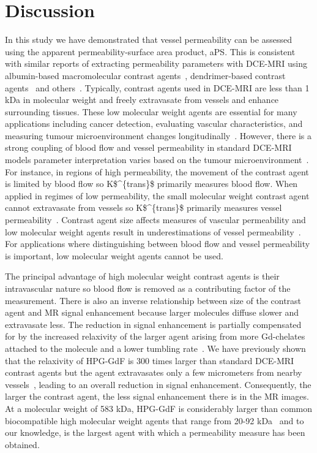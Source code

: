 \section{Discussion}

In this study we have demonstrated that vessel permeability can be assessed using the apparent permeability-surface area product, \acs{aPS}.
This is consistent with similar reports of extracting permeability parameters with \acs{DCE-MRI} using albumin-based macromolecular contrast agents~\cite{DaldrupLink:2004gy,Turetschek:2001wu}, dendrimer-based contrast agents~\cite{deLussanet:2005cb} and others~\cite{Turetschek:2004bw}.
Typically, contrast agents used in \acs{DCE-MRI} are less than 1 kDa in molecular weight and freely extravasate from vessels and enhance surrounding tissues.
These low molecular weight agents are essential for many applications including cancer detection,  evaluating vascular characteristics, and measuring tumour microenvironment changes longitudinally~\cite{Padhani:2002cj}.
However, there is a strong coupling of blood flow and vessel permeability in standard \acs{DCE-MRI} models parameter interpretation varies based on the tumour microenvironment~\cite{Gerstner:2008ba}.
For instance, in regions of high permeability, the movement of the contrast agent is limited by blood flow so \acs{K$^{trans}$} primarily measures blood flow.
When applied in regimes of low permeability, the small molecular weight contrast agent cannot extravasate from vessels so \acs{K$^{trans}$} primarily measures vessel permeability~\cite{Tofts:1999we}.
Contrast agent size affects measures of vascular permeability and low molecular weight agents result in underestimations of vessel permeability~\cite{deLussanet:2005cb}.
For applications where distinguishing between blood flow and vessel permeability is important, low molecular weight agents cannot be used.

The principal advantage of high molecular weight contrast agents is their intravascular nature so blood flow is removed as a contributing factor of the measurement.
There is also an inverse relationship between size of the contrast agent and MR signal enhancement because larger molecules diffuse slower and extravasate less.
The reduction in signal enhancement is partially compensated for by the increased relaxivity of the larger agent arising from more Gd-chelates attached to the molecule and a lower tumbling rate~\cite{Barrett:2006jx}.
We have previously shown that the relaxivity of \acs{HPG-GdF} is 300 times larger than standard \acs{DCE-MRI} contrast agents but the agent extravasates only a few micrometers from nearby vessels~\cite{Baker:2015cob}, leading to an overall reduction in signal enhancement.
Consequently, the larger the contrast agent, the less signal enhancement there is in the MR images.
At a molecular weight of 583 \acs{kDa}, \acs{HPG-GdF} is considerably larger than common biocompatible high molecular weight agents that range from 20-92 kDa~\cite{Barrett:2006jx} and to our knowledge, is the largest agent with which a permeability measure has been obtained.

